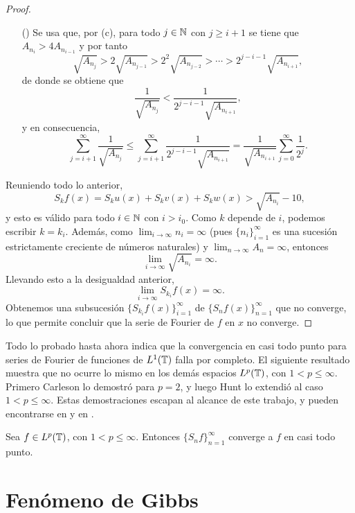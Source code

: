 \documentclass[a4paper, 12pt]{book}
\begin{document}
\begin{proof}
\begin{itemize}
        \item[(\asts{2})] Se usa que, por (c), para todo $j \in \mathbb N$ con $j \geq i+1$ se tiene que $A_{n_i} > 4A_{n_{i-1}}$ y por tanto
        \[\sqrt{A_{n_j}} > 2\sqrt{A_{n_{j-1}}} > 2^2 \sqrt{A_{n_{j-2}}} > \cdots > 2^{j-i-1}\sqrt{A_{n_{i+1}}},\]
        de donde se obtiene que
        \[\frac{1}{\sqrt{A_{n_j}}} < \frac{1}{2^{j-i-1}\sqrt{A_{n_{i+1}}}},\]
        y en consecuencia,
        \[\sum_{j=i+1}^\infty \frac{1}{\sqrt{A_{n_j}}} \leq \sum_{j=i+1}^\infty \frac{1}{2^{j-i-1}\sqrt{A_{n_{i+1}}}} = \frac{1}{\sqrt{A_{n_{i+1}}}}\sum_{j=0}^\infty \frac{1}{2^j}.\]
    \end{itemize}
    Reuniendo todo lo anterior,
    \[S_kf(x) = S_ku(x)+S_kv(x)+S_kw(x)> \sqrt{A_{n_i}}-10,\]
    y esto es válido para todo $i \in \mathbb N$ con $i > i_0$. Como $k$ depende de $i$, podemos escribir $k = k_i$. Además, como $\lim_{i \to \infty} n_i = \infty$ (pues $\{n_i\}_{i=1}^\infty$ es una sucesión estrictamente creciente de números naturales) y $\lim_{n \to \infty} A_n = \infty$, entonces \[\lim_{i \to \infty} \sqrt{A_{n_i}} = \infty.\] Llevando esto a la desigualdad anterior,
    \[\lim_{i \to \infty} S_{k_i}f(x) = \infty.\]
    Obtenemos una subsucesión $\{S_{k_i}f(x)\}_{i=1}^\infty$ de $\{S_nf(x)\}_{n=1}^\infty$ que no converge, lo que permite concluir que la serie de Fourier de $f$ en $x$ no converge.
\end{proof}

Todo lo probado hasta ahora indica que la convergencia en casi todo punto para series de Fourier de funciones de $L^1(\mathbb T)$ falla por completo. El siguiente resultado muestra que no ocurre lo mismo en los demás espacios $L^p(\mathbb T)$, con $1 < p \leq \infty$. Primero Carleson lo demostró para $p = 2$, y luego Hunt lo extendió al caso $1<p\leq\infty$. Estas demostraciones escapan al alcance de este trabajo, y pueden encontrarse en \cite{carleson} y en \cite{hunt}.

\begin{theorem}
    Sea $f \in L^p(\mathbb T)$, con $1 < p \leq \infty$. Entonces $\{S_nf\}_{n=1}^\infty$ converge a $f$ en casi todo punto.
\end{theorem}

\section{Fenómeno de Gibbs}
\end{document}
